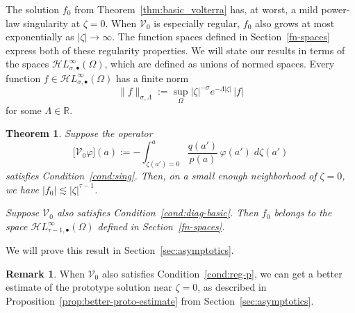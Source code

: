 \documentclass{article}
\theoremstyle{definition}
\newtheorem{rmk}{Remark}
\theoremstyle{plain}
\newtheorem{theorem}{Theorem}
\newcommand{\R}{\mathbb{R}}
\newcommand{\singexp}[2]{\mathcal{H}L^\infty_{#1, #2}}
\newcommand{\singexpalg}[1]{\singexp{#1}{\bullet}}
\newcommand{\hardpart}{\mathcal{V}_0}
\newcommand{\solproto}{f_0}
\newcommand{\domain}{\Omega}
\newenvironment{revtwo}{\color{revred}}{\color{black}}
\newenvironment{revtwo}{}{}
\begin{document}
The solution $\solproto$ from Theorem~\ref{thm:basic_volterra} has, at worst, a mild power-law singularity at $\zeta = 0$. When $\hardpart$ is especially regular, $\solproto$ also grows at most exponentially as $|\zeta| \to \infty$. The function spaces defined in Section~\ref{fn-spaces} express both of these regularity properties. \begin{revtwo}We will state our results in terms of the spaces $\singexpalg{\sigma}(\domain)$, which are defined as unions of normed spaces. Every function $f \in \singexpalg{\sigma}(\domain)$ has a finite norm
\[ \|f\|_{\sigma,\Lambda} := \sup_\Omega |\zeta|^{-\sigma} e^{-\Lambda|\zeta|}\,|f| \]
for some $\Lambda \in \R$.
\end{revtwo}
\begin{theorem}\label{thm:proto-growth}
\begin{revtwo}Suppose the operator
\[ \big[\hardpart \varphi\big](a) := - \int_{\zeta(a')=0}^{a} \frac{q(a')}{p(a)}\,\varphi(a')\;d\zeta(a') \]
\end{revtwo}
satisfies {\em Condition~\eqref{cond:sing}}. Then, on a small enough neighborhood of $\zeta = 0$, we have $|\solproto| \lesssim |\zeta|^{\tau-1}$.

Suppose $\hardpart$ also satisfies {\em Condition~\eqref{cond:diag-basic}}. Then $f_0$ belongs to the space $\singexpalg{\tau-1}(\domain)$ defined in Section~\ref{fn-spaces}.
\end{theorem}
We will prove this result in Section~\ref{sec:asymptotics}.
\begin{rmk}
When $\hardpart$ also satisfies Condition~\eqref{cond:reg-p}, we can get a better estimate of the prototype solution near $\zeta = 0$, as described in Proposition~\ref{prop:better-proto-estimate} from Section~\ref{sec:asymptotics}.
\end{rmk}
\end{document}
